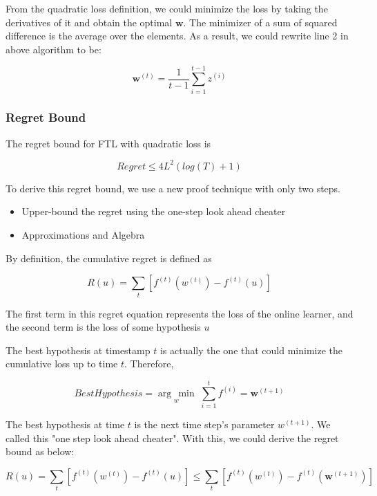 \documentclass[11pt]{article}
\newcommand{\argmin}[1]{\underset{#1}{\operatorname{arg}\,\operatorname{min}}\;}
\begin{document}
From the quadratic loss definition, we could minimize the loss by taking the derivatives of it and obtain the optimal $\bm{w}$. The minimizer of a sum of squared difference is the average over the elements. As a result, we could rewrite line 2 in above algorithm to be:

\begin{equation*}
    \bm{w}^{(t)} = \frac{1}{t-1} \sum_{i=1}^{t-1}z^{(i)}
\end{equation*}

\subsubsection{Regret Bound}
The regret bound for FTL with quadratic loss is 

\begin{equation*}
    Regret \leq 4L^2 (log(T) + 1)
\end{equation*}

To derive this regret bound, we use a new proof technique with only two steps. 

\begin{itemize}
    \item Upper-bound the regret using the one-step look ahead cheater
    \item Approximations and Algebra
\end{itemize}

By definition, the cumulative regret is defined as 

\begin{equation*}
    R(u) = \sum_t [f^{(t)} (w^{(t)}) - f^{(t)}(u)]
\end{equation*}

The first term in this regret equation represents the loss of the online learner, and the second term is the loss of some hypothesis $u$

The best hypothesis at timestamp $t$ is actually the one that could minimize the cumulative loss up to time $t$. Therefore,

\begin{equation*}
    Best Hypothesis = \argmin w \sum_{i=1}^t f^{(i)} = \bm{w}^{(t+1)}
\end{equation*}

The best hypothesis at time $t$ is the next time step's parameter $w^{(t+1)}$. We called this "one step look ahead cheater". With this, we could derive the regret bound as below:

\begin{equation*}
    R(u) = \sum_t [f^{(t)} (w^{(t)}) - f^{(t)}(u)] \leq \sum_t [f^{(t)} (w^{(t)}) - f^{(t)}(\bm{w}^{(t+1)})]
\end{equation*}
\end{document}
